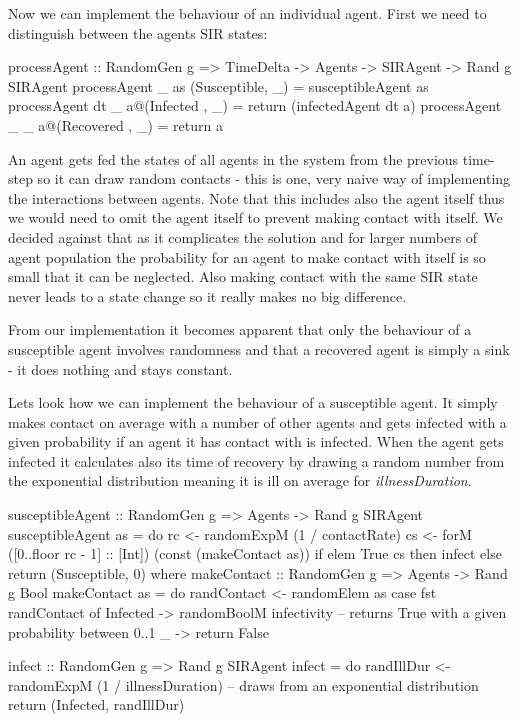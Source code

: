 Now we can implement the behaviour of an individual agent. First we need to distinguish between the agents SIR states:

\begin{HaskellCode}
processAgent :: RandomGen g => TimeDelta -> Agents -> SIRAgent -> Rand g SIRAgent
processAgent _  as   (Susceptible, _) = susceptibleAgent as
processAgent dt _  a@(Infected   , _) = return (infectedAgent dt a)
processAgent _  _  a@(Recovered  , _) = return a
\end{HaskellCode}

An agent gets fed the states of all agents in the system from the previous time-step so it can draw random contacts - this is one, very naive way of implementing the interactions between agents. Note that this includes also the agent itself thus we would need to omit the agent itself to prevent making contact with itself. We decided against that as it complicates the solution and for larger numbers of agent population the probability for an agent to make contact with itself is so small that it can be neglected. Also making contact with the same SIR state never leads to a state change so it really makes no big difference.

From our implementation it becomes apparent that only the behaviour of a susceptible agent involves randomness and that a recovered agent is simply a sink - it does nothing and stays constant.

Lets look how we can implement the behaviour of a susceptible agent. It simply makes contact on average with a number of other agents and gets infected with a given probability if an agent it has contact with is infected.
When the agent gets infected it calculates also its time of recovery by drawing a random number from the exponential distribution meaning it is ill on average for \textit{illnessDuration}.

\begin{HaskellCode}
susceptibleAgent :: RandomGen g => Agents -> Rand g SIRAgent
susceptibleAgent as = do
    rc <- randomExpM (1 / contactRate)
    cs <- forM ([0..floor rc - 1] :: [Int]) (const (makeContact as))
    if elem True cs
      then infect
      else return (Susceptible, 0)
  where
    makeContact :: RandomGen g => Agents -> Rand g Bool
    makeContact as = do
      randContact <- randomElem as
      case fst randContact of
        Infected -> randomBoolM infectivity -- returns True with a given probability between 0..1
        _        -> return False

    infect :: RandomGen g => Rand g SIRAgent
    infect = do
      randIllDur <- randomExpM (1 / illnessDuration) -- draws from an exponential distribution
      return (Infected, randIllDur)
\end{HaskellCode}


